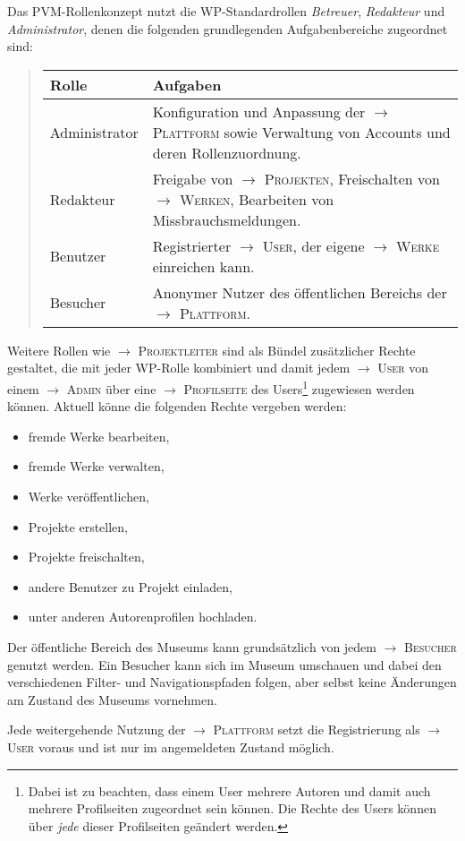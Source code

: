 \documentclass[a4paper,11pt]{article}
\newcommand{\glossar}[1]{{$\to$ \textsc{#1}}}
\begin{document}
Das PVM-Rollenkonzept nutzt die WP-Standardrollen \emph{Betreuer},
\emph{Redakteur} und \emph{Administrator}, denen die folgenden grundlegenden
Aufgabenbereiche zugeordnet sind: 
\begin{quote}
  \begin{tabular}{l|p{}}
    \textbf{Rolle} & \textbf{Aufgaben}\\\hline
    Administrator & Konfiguration und Anpassung der \glossar{Plattform} sowie
    Verwaltung von Accounts und deren Rollenzuordnung.\\ 
    Redakteur & Freigabe von \glossar{Projekten}, Freischalten von
    \glossar{Werken}, Bearbeiten von Missbrauchsmeldungen.\\ 
    Benutzer & Registrierter \glossar{User}, der eigene \glossar{Werke}
    einreichen kann.\\  
    Besucher & Anonymer Nutzer des öffentlichen Bereichs der
    \glossar{Plattform}.
  \end{tabular}
\end{quote}
Weitere Rollen wie \glossar{Projektleiter} sind als Bündel zusätzlicher Rechte
gestaltet, die mit jeder WP-Rolle kombiniert und damit jedem \glossar{User}
von einem \glossar{Admin} über eine \glossar{Profilseite} des
Users\footnote{Dabei ist zu beachten, dass einem User mehrere Autoren und
  damit auch mehrere Profilseiten zugeordnet sein können. Die Rechte des Users
  können über \emph{jede} dieser Profilseiten geändert werden.} zugewiesen
werden können. Aktuell könne die folgenden Rechte vergeben werden:
\begin{itemize}\itemsep0pt
\item fremde Werke bearbeiten,
\item fremde Werke verwalten,
\item Werke veröffentlichen,
\item Projekte erstellen,
\item Projekte freischalten,
\item andere Benutzer zu Projekt einladen,
\item unter anderen Autorenprofilen hochladen.
\end{itemize}

Der öffentliche Bereich des Museums kann grundsätzlich von jedem
\glossar{Besucher} genutzt werden. Ein Besucher kann sich im Museum umschauen
und dabei den verschiedenen Filter- und Navigationspfaden folgen, aber selbst
keine Änderungen am Zustand des Museums vornehmen.

Jede weitergehende Nutzung der \glossar{Plattform} setzt die Registrierung als
\glossar{User} voraus und ist nur im angemeldeten Zustand möglich.
\end{document}
